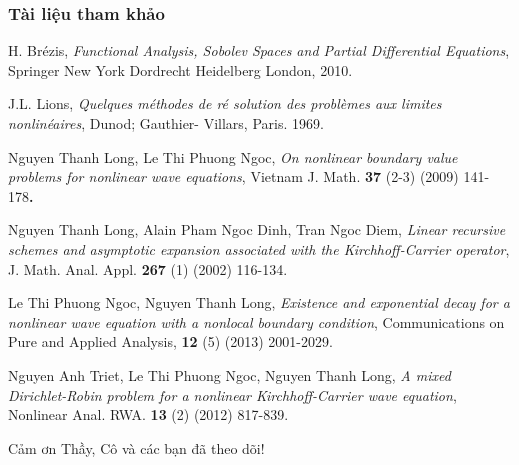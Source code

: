 \documentclass[9pt]{beamer}
\begin{document}
\begin{frame}
    \frametitle{Tài liệu tham khảo}
    \begin{thebibliography}{1}
 H. Brézis, \textit{Functional Analysis, Sobolev Spaces
and Partial Differential Equations}, Springer New York Dordrecht Heidelberg
London, 2010.

 J.L. Lions, \textit{Quelques m\'{e}thodes de r\'{e}%
solution des probl\`{e}mes aux limites nonlin\'{e}aires}, Dunod; Gauthier-
Villars, Paris. 1969.

 Nguyen Thanh Long, Le Thi Phuong Ngoc, \textit{On nonlinear
boundary value problems for nonlinear wave equations}, Vietnam J. Math. 
\textbf{37 }(2-3) (2009) 141-178\textbf{.}

 Nguyen Thanh Long, Alain Pham Ngoc Dinh, Tran Ngoc Diem, 
\textit{Linear recursive schemes and asymptotic expansion associated with
the Kirchhoff-Carrier operator}, J. Math. Anal. Appl. \textbf{267} (1)
(2002) 116-134.

 Le Thi Phuong Ngoc, Nguyen Thanh Long,
\textit{Existence and exponential decay for a nonlinear wave equation with 
a nonlocal boundary condition}, Communications on Pure and Applied Analysis,
\textbf{12} (5) (2013) 2001-2029.

 Nguyen Anh Triet, Le Thi Phuong Ngoc, Nguyen Thanh Long, 
\textit{A mixed Dirichlet-Robin problem for a nonlinear Kirchhoff-Carrier
wave equation}, Nonlinear Anal. RWA. \textbf{13} (2) (2012) 817-839.
\end{thebibliography}
\end{frame}


\begin{frame}
    \begin{center}
        \Huge Cảm ơn Thầy, Cô và các bạn đã theo dõi!
    \end{center}
\end{frame}
\end{document}
